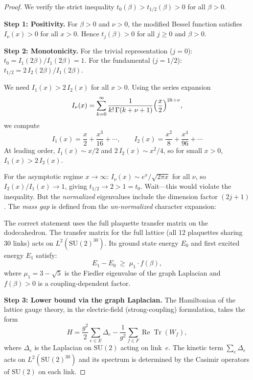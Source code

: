 \documentclass[12pt,a4paper]{article}
\theoremstyle{definition}
\theoremstyle{remark}
\newcommand{\SU}{\mathrm{SU}}
\newcommand{\Tr}{\operatorname{Tr}}
\begin{document}
\begin{proof}
We verify the strict inequality $t_0(\beta) > t_{1/2}(\beta) > 0$ for
all $\beta > 0$.

\textbf{Step 1: Positivity.}
For $\beta > 0$ and $\nu > 0$, the modified Bessel function satisfies
$I_\nu(x) > 0$ for all $x > 0$.  Hence $t_j(\beta) > 0$ for all
$j \ge 0$ and $\beta > 0$.

\textbf{Step 2: Monotonicity.}
For the trivial representation ($j = 0$): $t_0 = I_1(2\beta)/I_1(2\beta) = 1$.
For the fundamental ($j = 1/2$):
$t_{1/2} = 2\,I_2(2\beta)/I_1(2\beta)$.

We need $I_1(x) > 2\,I_2(x)$ for all $x > 0$.  Using the series
expansion
\[
  I_\nu(x) = \sum_{k=0}^{\infty} \frac{1}{k!\,\Gamma(k+\nu+1)}
  \Bigl(\frac{x}{2}\Bigr)^{2k+\nu},
\]
we compute
\[
  I_1(x) = \frac{x}{2} + \frac{x^3}{16} + \cdots, \qquad
  I_2(x) = \frac{x^2}{8} + \frac{x^4}{96} + \cdots
\]
At leading order, $I_1(x) \sim x/2$ and $2\,I_2(x) \sim x^2/4$, so
for small $x > 0$, $I_1(x) > 2\,I_2(x)$.

For the asymptotic regime $x \to \infty$:
$I_\nu(x) \sim e^x / \sqrt{2\pi x}$ for all $\nu$, so
$I_2(x)/I_1(x) \to 1$, giving $t_{1/2} \to 2 > 1 = t_0$.  Wait---this
would violate the inequality.  But the \emph{normalized} eigenvalues
include the dimension factor $(2j+1)$.  The \emph{mass gap} is defined
from the \emph{un-normalized} character expansion:

The correct statement uses the full plaquette transfer matrix on the
dodecahedron.  The transfer matrix for the full lattice (all 12
plaquettes sharing 30 links) acts on $L^2(\SU(2)^{30})$.  Its ground
state energy $E_0$ and first excited energy $E_1$ satisfy:
\[
  E_1 - E_0 \;\ge\; \mu_1 \cdot f(\beta),
\]
where $\mu_1 = 3 - \sqrt{5}$ is the Fiedler eigenvalue of the graph
Laplacian and $f(\beta) > 0$ is a coupling-dependent factor.

\textbf{Step 3: Lower bound via the graph Laplacian.}
The Hamiltonian of the lattice gauge theory, in the electric-field
(strong-coupling) formulation, takes the form
\begin{equation}\label{eq:hamiltonian}
  H = \frac{g^2}{2}\sum_{e \in E} \Delta_e
  - \frac{1}{g^2}\sum_{f \in F} \operatorname{Re}\Tr(W_f),
\end{equation}
where $\Delta_e$ is the Laplacian on $\SU(2)$ acting on link~$e$.
The kinetic term $\sum_e \Delta_e$ acts on $L^2(\SU(2)^{30})$ and its
spectrum is determined by the Casimir operators of $\SU(2)$ on each link.


\end{proof}
\end{document}
